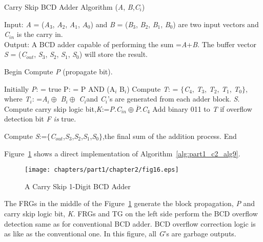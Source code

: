 \begin{algorithm}[!tbh]
	\caption{Carry Skip BCD Adder Algorithm ({\it A}, {\it B},{\it C${}_{i}$})}
	\label{alg:part1_c2_alg9}
	Input: {\it A }= ({\it A}${}_{3}$, {\it A}${}_{2}$, {\it A}${}_{1}$, {\it A}${}_{0}$) and {\it B }= ({\it B}${}_{3}$, {\it B}${}_{2}$, {\it B}${}_{1}$, {\it B}${}_{0}$) are two input vectors and {\it C}${}_{in}$ is the carry in.\\
	Output: A BCD adder capable of performing the sum ={\it A}+{\it B}. The buffer vector {\it S }= ({\it C}${}_{out}$, {\it S}${}_{3}$, {\it S}${}_{2}$, {\it S}${}_{1}$, {\it S}${}_{0}$) will store the result.
	\begin{algorithmic}[1]
		\STATE Begin
		\STATE Compute {\it P }(propagate bit).
		
		\STATE Initially {\it P}: = true
		\STATE P: = P AND (A${}_{i}$ B${}_{i}$)
		\ENDFOR
		\STATE Compute   {\it T}: = ${\{}${\it C}${}_{4}$,   {\it T}${}_{3}$,   {\it T}${}_{2}$,   {\it T}${}_{1}$,   {\it T}${}_{0}$${\}}$,   where   {\it T${}_{i}$}: ={\it A${}_{i}\oplus$} {\it B${}_{i}\oplus$} {\it C${}_{i}$}and {\it C${}_{i}$}'s are generated from each adder block.
		 {\it S}.
		\STATE Compute carry skip logic bit,{\it K}:={\it P}.{\it C}${}_{in}\oplus \overline{P}$.{\it C}${}_{4}$
		\STATE Add binary 011 to {\it T }if overflow detection bit {\it F is} true.
		
		\STATE Compute {\it S}:=${\{}${\it C}${}_{out}$,{\it S}${}_{3}$,{\it S}${}_{2}$,{\it S}${}_{1}$,{\it S}${}_{0}$${\}}$,the final sum of the addition process.
		\STATE End
	\end{algorithmic}
\end{algorithm}

\begin{example}\textnormal{
	Figure~\ref{fig:p1_c2_fig16} shows a direct implementation of Algorithm~\ref{alg:part1_c2_alg9}.}
\end{example}

\begin{figure}[!tbh]
	\centering
	\texttt{[image: chapters/part1/chapter2/fig16.eps]}
	\caption{A Carry Skip 1-Digit BCD Adder}
	\label{fig:p1_c2_fig16}
\end{figure}

The FRGs in the middle of the Figure~\ref{fig:p1_c2_fig16} generate the block propagation, {\it P }and carry skip logic bit, {\it K}. FRGs and TG on the left side perform the BCD overflow detection same as for conventional BCD adder. BCD overflow correction logic is as like as the conventional one. In this figure, all {\it G}'s are garbage outputs.

